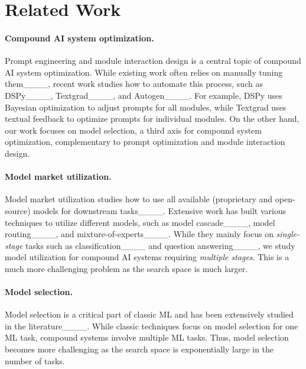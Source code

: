 \section{Related Work}
\label{sec:deluxeagent:Relatedwork}

\paragraph{Compound AI system optimization.} Prompt engineering and module interaction design is a central topic of compound AI system optimization. While existing work often relies on manually tuning them____, recent work studies how to automate this process, such as DSPy____, Textgrad____, and Autogen____. For example, DSPy uses Bayesian optimization to adjust prompts for all modules, while Textgrad uses textual feedback to optimize prompts for individual modules. On the other hand, our work focuses on model selection, a third axis for compound system optimization, complementary to prompt optimization and module interaction design. 

\paragraph{Model market utilization.} Model market utilization studies how to use all available (proprietary and open-source) models for downstream tasks____. Extensive work has built various techniques to utilize different models, such as model cascade____, model routing____, and mixture-of-experts____. While they mainly focus on  \textit{single-stage} tasks such as classification____ and question answering____, we study model utilization for compound AI systems requiring \textit{multiple stages}. This is a much more challenging problem as the search space is much larger. 

\paragraph{Model selection.} Model selection is a critical part of classic ML and has been extensively studied in the literature____. %
While classic techniques focus on model selection for one ML task, compound systems involve multiple ML tasks. Thus, model selection becomes more challenging as the search space is exponentially large in the number of tasks.  

